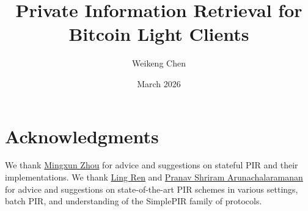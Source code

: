 \documentclass{article}
\title{Private Information Retrieval for Bitcoin Light Clients}
\author{Weikeng Chen}
\date{March 2026}
\begin{document}
\maketitle



\clearpage



\clearpage



\clearpage



\clearpage



\clearpage



\clearpage



\clearpage



\clearpage



\clearpage



\clearpage

\section*{Acknowledgments}

We thank \href{https://wuwuz.github.io/}{Mingxun Zhou} for advice and suggestions on stateful PIR and their implementations. We thank \href{https://sites.google.com/view/renling}{Ling Ren} and \href{https://scholar.google.com/citations?user=f54M0ikAAAAJ&hl=en}{Pranav Shriram Arunachalaramanan} for advice and suggestions on state-of-the-art PIR schemes in various settings, batch PIR, and understanding of the SimplePIR family of protocols.


\end{document}
